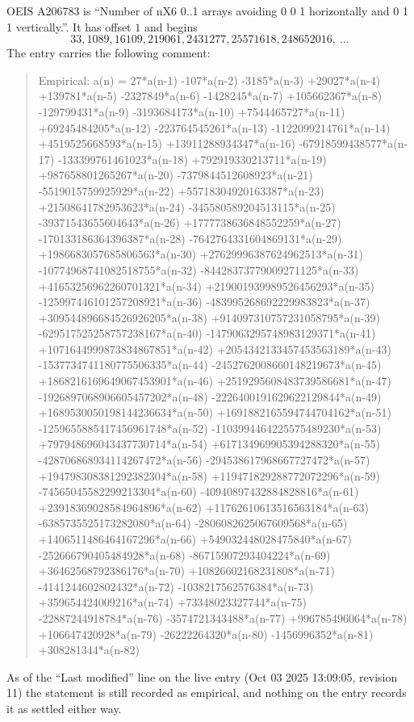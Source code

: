 \documentclass[11pt,a4paper]{article}
\theoremstyle{plain}
\theoremstyle{definition}
\begin{document}
OEIS A206783 is ``Number of nX6 0..1 arrays avoiding 0 0 1 horizontally and 0 1 1 vertically.''. It has offset
$1$ and begins
\[
33, 1089, 16109, 219061, 2431277, 25571618, 248652016,\ \dots
\]
The entry carries the following comment:
\begin{quote}\small
Empirical: a(n) = 27*a(n-1) -107*a(n-2) -3185*a(n-3) +29027*a(n-4) +139781*a(n-5) -2327849*a(n-6) -1428245*a(n-7) +105662367*a(n-8) -129799431*a(n-9) -3193684173*a(n-10) +7544465727*a(n-11) +69245484205*a(n-12) -223764545261*a(n-13) -1122099214761*a(n-14) +4519525668593*a(n-15) +13911288934347*a(n-16) -67918599438577*a(n-17) -133399761461023*a(n-18) +792919330213711*a(n-19) +987658801265267*a(n-20) -7379844512608923*a(n-21) -5519015759925929*a(n-22) +55718304920163387*a(n-23) +21508641782953623*a(n-24) -345580589204513115*a(n-25) -39371543655604643*a(n-26) +1777738636848552259*a(n-27) -170133186364396387*a(n-28) -7642764331604869131*a(n-29) +1986683057685806563*a(n-30) +27629996387624962513*a(n-31) -10774968741082518755*a(n-32) -84428373779009271125*a(n-33) +41653256962260701321*a(n-34) +219001939989526456293*a(n-35) -125997446101257208921*a(n-36) -483995268692229983823*a(n-37) +309544896684526926205*a(n-38) +914097310757231058795*a(n-39) -629517525258757238167*a(n-40) -1479063295748983129371*a(n-41) +1071644999873834867851*a(n-42) +2054342133457453563189*a(n-43) -1537734741180775506335*a(n-44) -2452762008660148219673*a(n-45) +1868216169649067453901*a(n-46) +2519295608483739586681*a(n-47) -1926897068906605457202*a(n-48) -2226400191629622129844*a(n-49) +1689530050198144236634*a(n-50) +1691882165594744704162*a(n-51) -1259655885417456961748*a(n-52) -1103994464225575489230*a(n-53) +797948696043437730714*a(n-54) +617134969905394288320*a(n-55) -428706868934114267472*a(n-56) -294538617968667727472*a(n-57) +194798308381292382304*a(n-58) +119471829288772072296*a(n-59) -74565045582299213304*a(n-60) -40940897432884828816*a(n-61) +23918369028584964896*a(n-62) +11762610613516563184*a(n-63) -6385735525173282080*a(n-64) -2806082625067609568*a(n-65) +1406511486464167296*a(n-66) +549032448028475840*a(n-67) -252666790405484928*a(n-68) -86715907293404224*a(n-69) +36462568792386176*a(n-70) +10826602168231808*a(n-71) -4141244602802432*a(n-72) -1038217562576384*a(n-73) +359654424009216*a(n-74) +73348023327744*a(n-75) -22887244918784*a(n-76) -3574721343488*a(n-77) +996785496064*a(n-78) +106647420928*a(n-79) -26222264320*a(n-80) -1456996352*a(n-81) +308281344*a(n-82)
\end{quote}
As of the ``Last modified'' line on the live entry (Oct 03 2025 13:09:05, revision
11) the statement is still recorded as empirical, and nothing on the entry
records it as settled either way.
\end{document}
